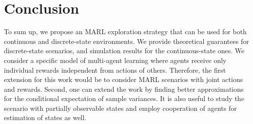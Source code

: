 \documentclass[lettersize,journal]{IEEEtran}
\begin{document}

\section{Conclusion}
To sum up, we propose an MARL exploration strategy that can be used for both continuous and discrete-state environments.  We provide theoretical guarantees for discrete-state scenarios, and simulation results for the continuous-state ones.  We consider a specific model of multi-agent learning where agents receive only individual rewards independent from actions of others. Therefore, the first extension for this work would be to consider MARL scenarios with joint actions and rewards. Second, one can extend the work by finding better approximations for the conditional expectation of sample variances. It is also useful to study the scenario with partially observable states and employ cooperation of agents for estimation of states as well.
\end{document}
